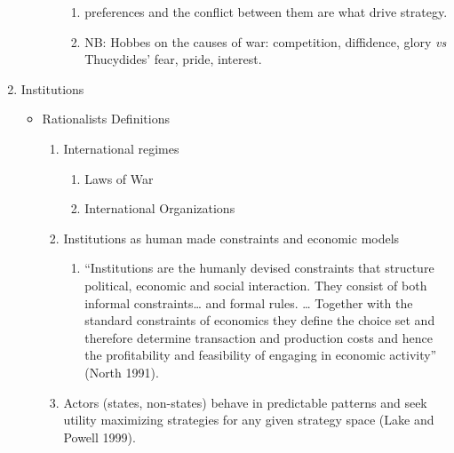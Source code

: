 \documentclass[11pt]{article}
\begin{document}
\begin{enumerate}
\begin{itemize}
\begin{enumerate}
\begin{enumerate}
\item preferences and the conflict between them are what drive strategy.
\item NB: Hobbes on the causes of war: competition, diffidence, glory
\emph{vs} Thucydides' fear, pride, interest.
\end{enumerate}
\end{enumerate}
\end{itemize}
\item Institutions
\label{sec-1-1-5}
\begin{itemize}
\item Rationalists Definitions
\label{sec-1-1-5-1}
\begin{enumerate}
\item International regimes
\begin{enumerate}
\item Laws of War
\item International Organizations
\end{enumerate}
\item Institutions as human made constraints and economic models
\begin{enumerate}
\item ``Institutions are the humanly devised constraints that structure
political, economic and social interaction. They consist of both
informal constraints\ldots{} and formal rules. \ldots{} Together with the
standard constraints of economics they define the choice set and
therefore determine transaction and production costs and hence
the profitability and feasibility of engaging in economic
activity'' (North 1991).
\end{enumerate}
\item Actors (states, non-states) behave in predictable patterns and seek
utility maximizing strategies for any given strategy space (Lake
and Powell 1999).
\end{enumerate}



\end{itemize}
\end{enumerate}
\end{document}
